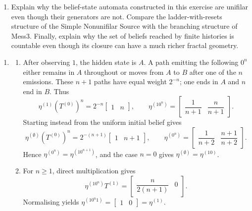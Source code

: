 \begin{exercise}
\begin{enumerate}
\begin{enumerate}
        \item Explain why the belief-state automata constructed in this
          exercise are unifilar even though their generators are not. Compare
          the ladder-with-resets structure of the Simple Nonunifilar Source
          with the branching structure of Mess3. Finally, explain why the set
          of beliefs reached by finite histories is countable even though its
          closure can have a much richer fractal geometry.
      \end{enumerate}
  \end{enumerate}
\end{exercise}
\begin{solution}[ex:p3-3]
    \begin{enumerate}
      \item
        \begin{enumerate}
          \item After observing $1$, the hidden state is $A$. A path emitting
            the following $0^n$ either remains in $A$ throughout or moves from
            $A$ to $B$ after one of the $n$ emissions. These $n+1$ paths have
            equal weight $2^{-n}$; one ends in $A$ and $n$ end in $B$. Thus
            \[
              \eta^{(1)}(T^{(0)})^n
                =2^{-n}\begin{bmatrix}1&n\end{bmatrix},
              \qquad
              \eta^{(10^n)}=
                \begin{bmatrix}\dfrac1{n+1}&\dfrac n{n+1}\end{bmatrix}.
            \]
            Starting instead from the uniform initial belief gives
            \[
              \eta^{(\emptyset)}(T^{(0)})^n
                =2^{-(n+1)}\begin{bmatrix}1&n+1\end{bmatrix},
              \qquad
              \eta^{(0^n)}=
                \begin{bmatrix}\dfrac1{n+2}&\dfrac{n+1}{n+2}\end{bmatrix}.
            \]
            Hence $\eta^{(0^n)}=\eta^{(10^{n+1})}$, and the case $n=0$
            gives $\eta^{(\emptyset)}=\eta^{(10)}$.

          \item For $n\geq1$, direct multiplication gives
            \[
              \eta^{(10^n)}T^{(1)}
                =\begin{bmatrix}\dfrac n{2(n+1)}&0\end{bmatrix}.
            \]
            Normalising yields
            $\eta^{(10^n1)}=\begin{bmatrix}1&0\end{bmatrix}=\eta^{(1)}$.


\end{enumerate}
\end{enumerate}
\end{solution}
